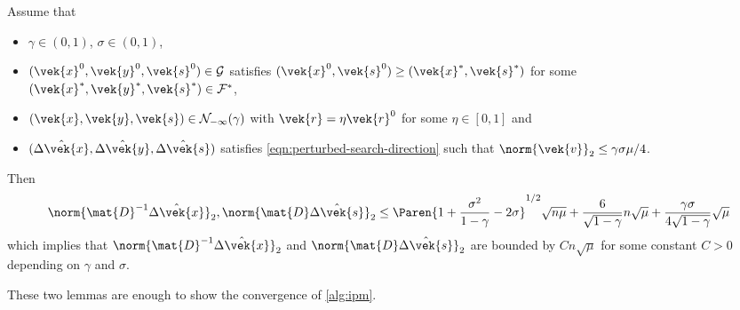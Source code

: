 \begin{lemma}\label{thm:delta-x-s-bound}
  Assume that
  \begin{itemize}
    \item \(\gamma \in (0, 1)\), \(\sigma \in (0, 1)\), 
    \item \((\vek{x}^0, \vek{y}^0, \vek{s}^0) \in \mathcal{G}\) satisfies \((\vek{x}^0, \vek{s}^0) \geq (\vek{x}^*, \vek{s}^*)\) for some \((\vek{x}^*, \vek{y}^*, \vek{s}^*) \in \mathcal{F}^*\), 
    \item \((\vek{x}, \vek{y}, \vek{s}) \in \mathcal{N}_{-\infty}(\gamma)\) with \(\vek{r} = \eta \vek{r}^0\) for some \(\eta \in [0, 1]\) and
    \item \((\hat{\Delta\vek{x}}, \hat{\Delta\vek{y}}, \hat{\Delta\vek{s}})\) satisfies \cref{eqn:perturbed-search-direction} such that \(\norm{\vek{v}}_2 \leq \gamma \sigma \mu / 4\).
  \end{itemize}
  Then
  \[ \norm{\mat{D}^{-1}\hat{\Delta\vek{x}}}_2, \norm{\mat{D}\hat{\Delta\vek{s}}}_2 \leq \Paren{1 + \frac{\sigma^2}{1- \gamma} - 2\sigma}^{1/2} \sqrt{n \mu} + \frac{6}{\sqrt{1 - \gamma}} n\sqrt{\mu} + \frac{\gamma \sigma}{4 \sqrt{1 - \gamma}}\sqrt{\mu}\]
  which implies that \(\norm{\mat{D}^{-1}\hat{\Delta\vek{x}}}_2\) and \(\norm{\mat{D}\hat{\Delta\vek{s}}}_2\) are bounded by \(C n \sqrt{\mu}\) for some constant \(C > 0\) depending on \(\gamma\) and \(\sigma\).
\end{lemma}

These two lemmas are enough to show the convergence of \cref{alg:ipm}.

